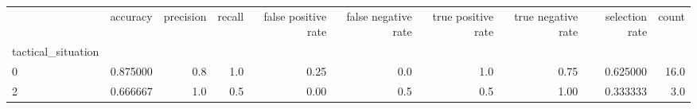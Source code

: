 \begin{tabular}{lrrrrrrrrr}
\toprule
{} &  accuracy &  precision &  recall &  false positive rate &  false negative rate &  true positive rate &  true negative rate &  selection rate &  count \\
tactical\_situation &           &            &         &                      &                      &                     &                     &                 &        \\
\midrule
0                  &  0.875000 &        0.8 &     1.0 &                 0.25 &                  0.0 &                 1.0 &                0.75 &        0.625000 &   16.0 \\
2                  &  0.666667 &        1.0 &     0.5 &                 0.00 &                  0.5 &                 0.5 &                1.00 &        0.333333 &    3.0 \\
\bottomrule
\end{tabular}
